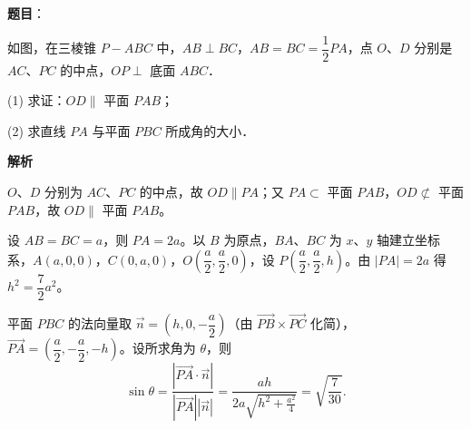\begin{answer}

\textbf{题目}：

如图，在三棱锥 $P - ABC$ 中，$AB \perp BC$，$AB = BC = \dfrac{1}{2}PA$，点 $O$、$D$ 分别是 $AC$、$PC$ 的中点，$OP \perp$ 底面 $ABC$．

(1) 求证：$OD \parallel$ 平面 $PAB$；

(2) 求直线 $PA$ 与平面 $PBC$ 所成角的大小．
\nopagebreak[4]
\begin{center}\end{center}
\nopagebreak[4]
\textbf{解析}


$O$、$D$ 分别为 $AC$、$PC$ 的中点，故 $OD \parallel PA$；又 $PA \subset$ 平面 $PAB$，$OD \not\subset$ 平面 $PAB$，故 $OD \parallel$ 平面 $PAB$。


设 $AB = BC = a$，则 $PA = 2a$。以 $B$ 为原点，$BA$、$BC$ 为 $x$、$y$ 轴建立坐标系，$A(a, 0, 0)$，$C(0, a, 0)$，$O\left(\dfrac{a}{2}, \dfrac{a}{2}, 0\right)$，设 $P\left(\dfrac{a}{2}, \dfrac{a}{2}, h\right)$。由 $|PA| = 2a$ 得 $h^2 = \dfrac{7}{2}a^2$。

平面 $PBC$ 的法向量取 $\vec{n} = (h, 0, -\dfrac{a}{2})$（由 $\overrightarrow{PB} \times \overrightarrow{PC}$ 化简），$\overrightarrow{PA} = \left(\dfrac{a}{2}, -\dfrac{a}{2}, -h\right)$。设所求角为 $\theta$，则
\nopagebreak[4]
\[
\sin\theta = \frac{|\overrightarrow{PA}\cdot\vec{n}|}{|\overrightarrow{PA}||\vec{n}|} = \frac{ah}{2a\sqrt{h^2 + \frac{a^2}{4}}} = \sqrt{\frac{7}{30}}.
\]



\end{answer}
